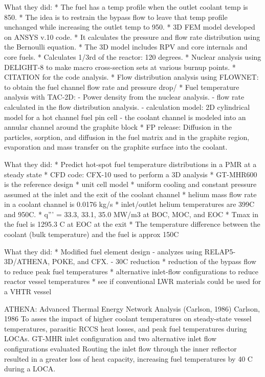 What they did:
* The fuel has a temp profile when the outlet coolant temp is 850.
* The idea is to restrain the bypass flow to leave that temp profile unchanged while increasing the outlet temp to 950.
* 3D FEM model developed on ANSYS v.10 code.
* It calculates the pressure and flow rate distribution using the Bernoulli equation.
* The 3D model includes RPV and core internals and core fuels.
* Calculates 1/3rd of the reactor: 120 degrees.
* Nuclear analysis using DELIGHT-8 to make macro cross-section sets at various burnup points.
* CITATION for the code analysis.
* Flow distribution analysis using FLOWNET: to obtain the fuel channel flow rate and pressure drop/
* Fuel temperature analysis with TAC-2D:
	- Power density from the nuclear analysis.
	- flow rate calculated in the flow distribution analysis.
	- calculation model: 2D cylindrical model for a hot channel fuel pin cell
	- the coolant channel is modeled into an annular channel around the graphite block
* FP release: Diffusion in the particles, sorption, and diffusion in the fuel matrix and in the graphite region, evaporation and mass transfer on the graphite surface into the coolant.

What they did:
* Predict hot-spot fuel temperature distributions in a PMR at a steady state
* CFD code: CFX-10 used to perform a 3D analysis
* GT-MHR600 is the reference design
* unit cell model
* uniform cooling and constant pressure assumed at the inlet and the exit of the coolant channel
* helium mass flow rate in a coolant channel is 0.0176 kg/s
* inlet/outlet helium temperatures are 399C and 950C.
* q''' = 33.3, 33.1, 35.0 MW/m3 at BOC, MOC, and EOC
* Tmax in the fuel is 1295.3 C at EOC at the exit
* The temperature difference between the coolant (bulk temperature) and the fuel is approx 150C

What they did:
* Modified fuel element design
	- analyzes using RELAP5-3D/ATHENA, POKE, and CFX.
	- 30C reduction
* reduction of the bypass flow to reduce peak fuel temperatures
* alternative inlet-flow configurations to reduce reactor vessel temperatures
* see if conventional LWR materials could be used for a VHTR vessel

ATHENA: Advanced Thermal Energy Network Analysis (Carlson, 1986)
Carlson, 1986
To asses the impact of higher coolant temperatures on steady-state vessel temperatures, parasitic RCCS heat losses, and peak fuel temperatures during LOCAs.
GT-MHR inlet configuration and two alternative inlet flow configurations evaluated
Routing the inlet flow through the inner reflector resulted in a greater loss of heat capacity, increasing fuel temperatures by 40 C during a LOCA.

